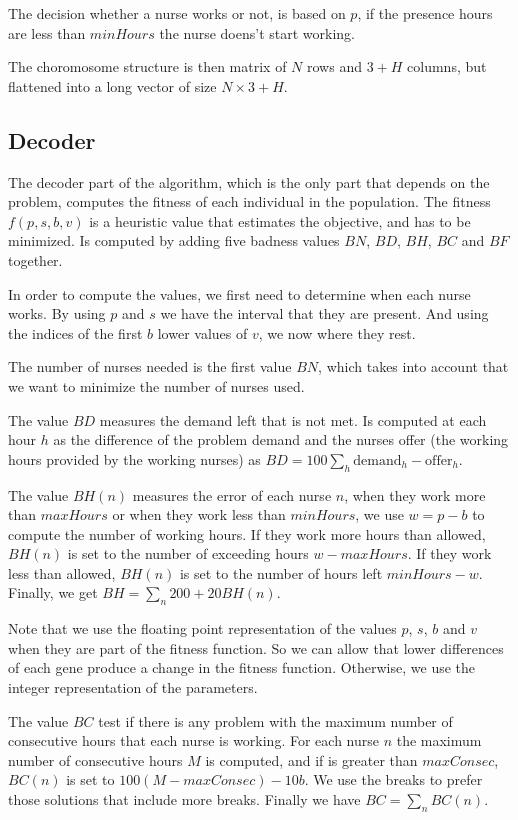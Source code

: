 \documentclass[12pt,a4paper]{article}
\begin{document}
The decision whether a nurse works or not, is based on $p$, if the presence 
hours are less than $minHours$ the nurse doens't start working.

The choromosome structure is then matrix of $N$ rows and $3+H$ columns, but 
flattened into a long vector of size $N \times 3+H$.

\subsection{Decoder}

The decoder part of the algorithm, which is the only part that depends on the 
problem, computes the fitness of each individual in the population. The fitness 
$f(p,s,b,v)$ is a heuristic value that estimates the objective, and has to be 
minimized. Is computed by adding five badness values $BN$, $BD$, $BH$, $BC$ and 
$BF$ together.

In order to compute the values, we first need to determine when each nurse 
works. By using $p$ and $s$ we have the interval that they are present.  And 
using the indices of the first $b$ lower values of $v$, we now where they rest.

The number of nurses needed is the first value $BN$, which takes into account 
that we want to minimize the number of nurses used.

The value $BD$ measures the demand left that is not met. Is computed at each 
hour $h$ as the difference of the problem demand and the nurses offer (the 
working hours provided by the working nurses) as $BD = 100 \sum_h 
\textrm{demand}_h - \textrm{offer}_h$.

The value $BH(n)$ measures the error of each nurse $n$, when they work more than 
$maxHours$ or when they work less than $minHours$, we use $w = p - b$ to compute 
the number of working hours. If they work more hours than allowed, $BH(n)$ is 
set to the number of exceeding hours $w - maxHours$. If they work less than 
allowed, $BH(n)$ is set to the number of hours left $minHours - w$.  Finally, we 
get $BH = \sum_n 200 + 20 BH(n)$.

Note that we use the floating point representation of the values $p$, $s$, $b$ 
and $v$ when they are part of the fitness function. So we can allow that lower 
differences of each gene produce a change in the fitness function. Otherwise, we 
use the integer representation of the parameters.

The value $BC$ test if there is any problem with the maximum number of 
consecutive hours that each nurse is working. For each nurse $n$ the maximum 
number of consecutive hours $M$ is computed, and if is greater than $maxConsec$, 
$BC(n)$ is set to $100(M - maxConsec) - 10b$. We use the breaks to prefer those 
solutions that include more breaks. Finally we have $BC = \sum_n BC(n)$.
\end{document}
